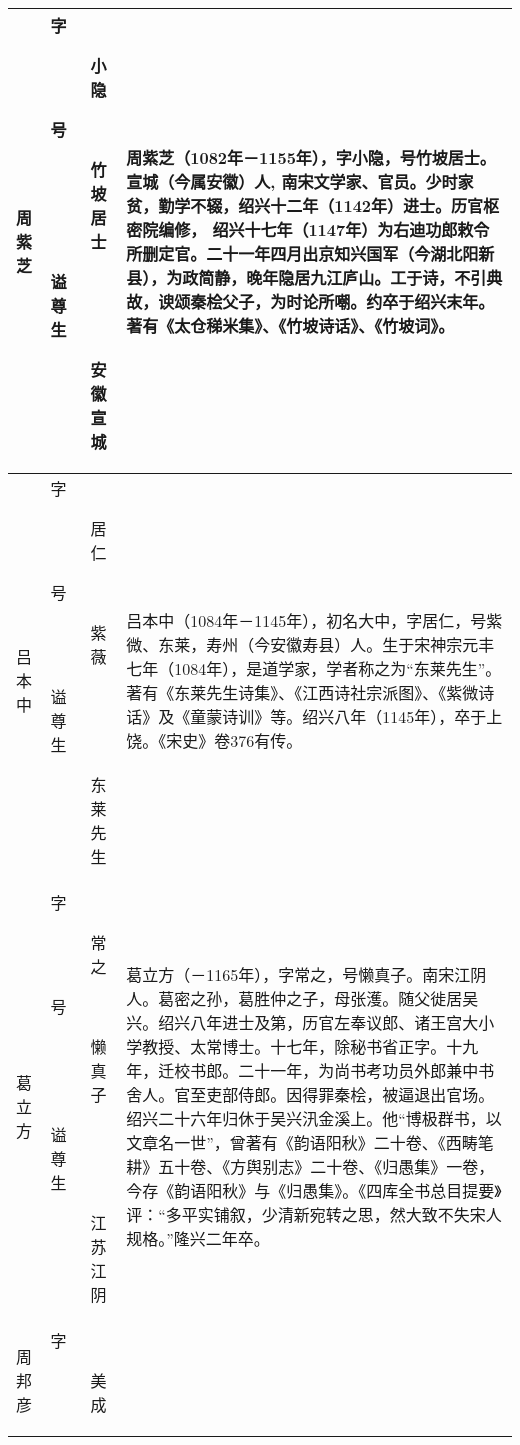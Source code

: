\begin{longtable}{|>{\centering\namefont\heiti}m{2em}|>{\centering\tiny}m{3.0em}|>{\xzfont\kaiti}m{7.3em}|}
  周紫芝 & \begin{description}
  \item[字] 小隐
  \item[号] 竹坡居士
  \item[谥] 
  \item[尊] 
  \item[生] 安徽宣城
  \end{description} & 周紫芝（1082年－1155年），字小隐，号竹坡居士。宣城（今属安徽）人, 南宋文学家、官员。少时家贫，勤学不辍，绍兴十二年（1142年）进士。历官枢密院编修， 绍兴十七年（1147年）为右迪功郎敕令所删定官。二十一年四月出京知兴国军（今湖北阳新县），为政简静，晚年隐居九江庐山。工于诗，不引典故，谀颂秦桧父子，为时论所嘲。约卒于绍兴末年。著有《太仓稊米集》、《竹坡诗话》、《竹坡词》。 \tabularnewline\hline
  吕本中 & \begin{description}
  \item[字] 居仁
  \item[号] 紫薇
  \item[谥] 
  \item[尊] 
  \item[生] 东莱先生
  \end{description} & 吕本中（1084年－1145年），初名大中，字居仁，号紫微、东莱，寿州（今安徽寿县）人。生于宋神宗元丰七年（1084年），是道学家，学者称之为“东莱先生”。著有《东莱先生诗集》、《江西诗社宗派图》、《紫微诗话》及《童蒙诗训》等。绍兴八年（1145年），卒于上饶。《宋史》卷376有传。 \tabularnewline\hline
  葛立方 & \begin{description}
  \item[字] 常之
  \item[号] 懒真子
  \item[谥] 
  \item[尊] 
  \item[生] 江苏江阴
  \end{description} & 葛立方（－1165年），字常之，号懒真子。南宋江阴人。葛密之孙，葛胜仲之子，母张濩。随父徙居吴兴。绍兴八年进士及第，历官左奉议郎、诸王宫大小学教授、太常博士。十七年，除秘书省正字。十九年，迁校书郎。二十一年，为尚书考功员外郎兼中书舍人。官至吏部侍郎。因得罪秦桧，被逼退出官场。绍兴二十六年归休于吴兴汛金溪上。他“博极群书，以文章名一世”，曾著有《韵语阳秋》二十卷、《西畴笔耕》五十卷、《方舆别志》二十卷、《归愚集》一卷，今存《韵语阳秋》与《归愚集》。《四库全书总目提要》评：“多平实铺叙，少清新宛转之思，然大致不失宋人规格。”隆兴二年卒。 \tabularnewline\hline
  周邦彦 & \begin{description}
  \item[字] 美成

\end{description}
\end{longtable}
